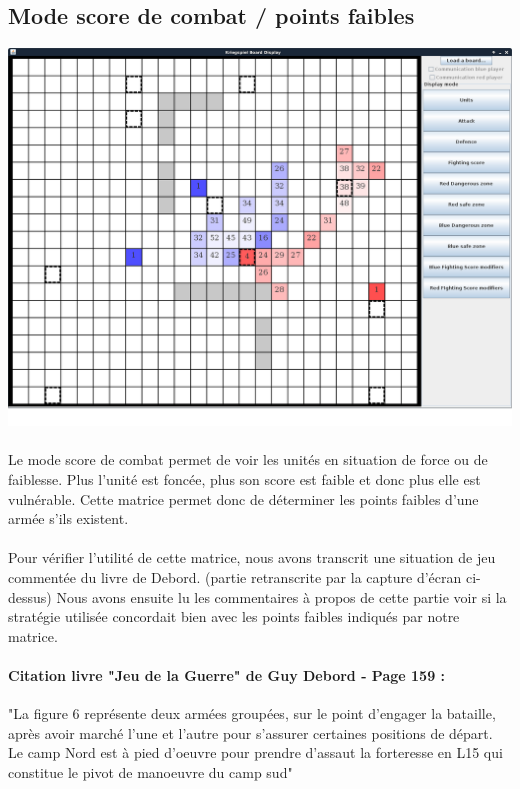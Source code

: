 		\subsection{Mode score de combat / points faibles}

			\centerline{\includegraphics[scale=0.4]{images/screen_fscore.png}}
			
			\paragraph{}
			Le mode score de combat permet de voir les unités en situation de force ou de faiblesse.
			Plus l'unité est foncée, plus son score est faible et donc plus elle est vulnérable.
			Cette matrice permet donc de déterminer les points faibles d'une armée s'ils existent.
			
			\paragraph{}
			Pour vérifier l'utilité de cette matrice, nous avons transcrit une situation de jeu commentée du livre de Debord.\cite{ref2} (partie retranscrite
			par la capture d'écran ci-dessus) Nous avons ensuite lu les commentaires à propos de cette partie voir si la stratégie utilisée concordait bien
			avec les points faibles indiqués par notre matrice.
			
			\paragraph{Citation livre "Jeu de la Guerre" de Guy Debord - Page 159 \cite{ref2} : }
			"La figure 6 représente deux armées groupées, sur le point d'engager la bataille, après avoir marché l'une et l'autre pour s'assurer certaines positions
			de départ. Le camp Nord est à pied d'oeuvre pour prendre d'assaut la forteresse en L15 qui constitue le pivot de manoeuvre du camp sud"
			
